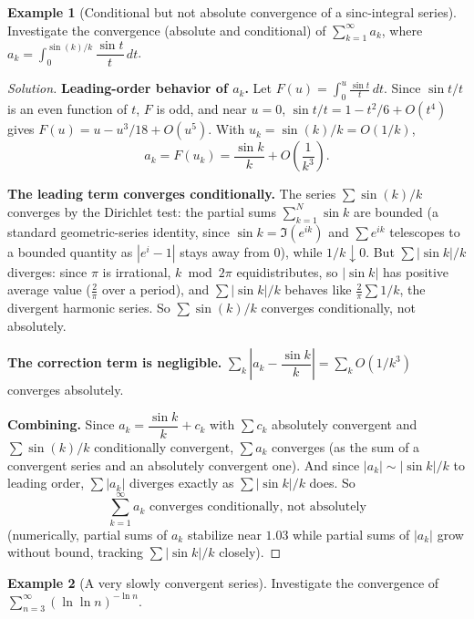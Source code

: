 \documentclass[11pt]{article}
\theoremstyle{definition}
\newtheorem{example}{Example}[section]
\begin{document}
\begin{example}[Conditional but not absolute convergence of a sinc-integral series]
Investigate the convergence (absolute and conditional) of $\displaystyle\sum_{k=1}^\infty a_k$, where $a_k=\int_0^{\sin(k)/k}\dfrac{\sin t}t\,dt$.
\end{example}

\begin{proof}[Solution]
\textbf{Leading-order behavior of $a_k$.} Let $F(u)=\int_0^u\frac{\sin t}t\,dt$. Since $\sin t/t$ is an even function of $t$, $F$ is odd, and near $u=0$, $\sin t/t=1-t^2/6+O(t^4)$ gives $F(u)=u-u^3/18+O(u^5)$. With $u_k=\sin(k)/k=O(1/k)$,
\[
a_k=F(u_k)=\frac{\sin k}k+O\!\left(\frac1{k^3}\right).
\]

\textbf{The leading term converges conditionally.} The series $\sum \sin(k)/k$ converges by the Dirichlet test: the partial sums $\sum_{k=1}^N\sin k$ are bounded (a standard geometric-series identity, since $\sin k=\Im(e^{ik})$ and $\sum e^{ik}$ telescopes to a bounded quantity as $|e^i-1|$ stays away from $0$), while $1/k\downarrow0$. But $\sum|\sin k|/k$ diverges: since $\pi$ is irrational, $k\bmod 2\pi$ equidistributes, so $|\sin k|$ has positive average value ($\tfrac2\pi$ over a period), and $\sum|\sin k|/k$ behaves like $\tfrac2\pi\sum1/k$, the divergent harmonic series. So $\sum\sin(k)/k$ converges conditionally, not absolutely.

\textbf{The correction term is negligible.} $\sum_k\left|a_k-\dfrac{\sin k}k\right|=\sum_k O(1/k^3)$ converges absolutely.

\textbf{Combining.} Since $a_k=\dfrac{\sin k}k+c_k$ with $\sum c_k$ absolutely convergent and $\sum\sin(k)/k$ conditionally convergent, $\sum a_k$ converges (as the sum of a convergent series and an absolutely convergent one). And since $|a_k|\sim|\sin k|/k$ to leading order, $\sum|a_k|$ diverges exactly as $\sum|\sin k|/k$ does. So
\[
\boxed{\sum_{k=1}^\infty a_k \text{ converges conditionally, not absolutely}}
\]
(numerically, partial sums of $a_k$ stabilize near $1.03$ while partial sums of $|a_k|$ grow without bound, tracking $\sum|\sin k|/k$ closely).
\end{proof}

\begin{example}[A very slowly convergent series]
Investigate the convergence of $\displaystyle\sum_{n=3}^\infty (\ln\ln n)^{-\ln n}$.
\end{example}
\end{document}
